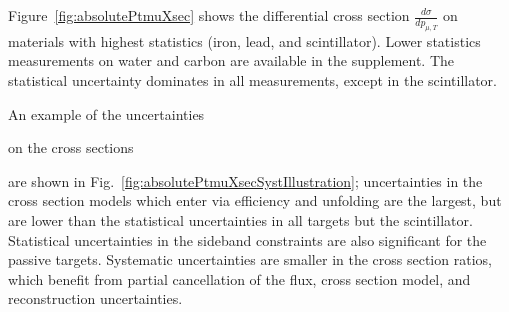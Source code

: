 \documentclass[aps,preprint,showpacs,superscriptaddress,letterpaper,showkeys,superscriptaddress,nofootinbib,floatfix]{revtex4-1}
\newcommand{\firstReviewAdd}[1]{{\bf\color{blue} \protect #1}}
\newcommand{\firstReviewStrike}[1]{{\bf\color{blue}\protect \sout{#1}}}
\newcommand{\firstRefereeStrike}[1]{{\bf\color{green}\protect \sout{#1}}}
\renewcommand{\firstReviewAdd}[1]{\protect #1}
\renewcommand{\firstReviewStrike}[1]{}
\renewcommand{\firstRefereeStrike}[1]{}
\begin{document}
Figure~\ref{fig:absolutePtmuXsec} shows the differential cross section $\frac{d\sigma}{dp_{\mu,T}}$ \firstReviewAdd{ on} materials with highest statistics (iron, lead, and scintillator). Lower statistics measurements on water and carbon are available in the supplement.  \firstReviewStrike{The masses of all the passive targets are small enough that } 
\firstReviewAdd{The statistical uncertainty dominates in all measurements, except in the scintillator.  }
\firstReviewStrike{ The masses of the carbon and water target are smaller than the lead and iron, and thus the cross sections on the former targets have particularly large uncertainties.}  
\firstReviewStrike{ An illustration of the }
\firstReviewAdd{ An example of the } uncertainties 
\firstReviewStrike{in}
\firstReviewAdd{on} the cross sections 
\firstReviewStrike{ is} 
\firstReviewAdd{are} shown in Fig.~\ref{fig:absolutePtmuXsecSystIllustration}; uncertainties in the \firstRefereeStrike{assumed input} cross section models which enter via efficiency and unfolding are the largest, but are \firstReviewAdd{lower than the statistical uncertainties in all targets but the scintillator.} 
\firstReviewStrike{ typically comparable or less than statistical errors, except in the highest statistics bin of the scintillator. } Statistical uncertainties in the sideband constraints are also significant for the passive targets.  Systematic uncertainties are smaller in the cross section ratios, which benefit from partial cancellation of the flux, cross section model, and reconstruction uncertainties.  
\end{document}
